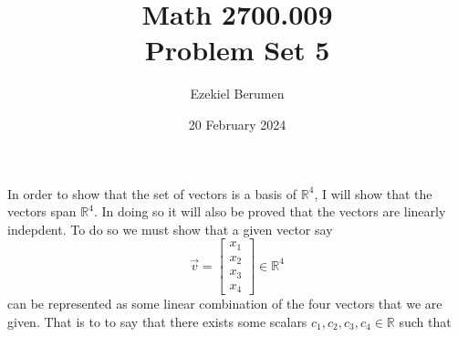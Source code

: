 \documentclass{report}
\title{\Huge{Math 2700.009}\\Problem Set 5}
\author{\huge{Ezekiel Berumen}}
\date{20 February 2024}
\begin{document}
\maketitle
\newpage

\sol In order to show that the set of vectors is a basis of $\mathbb{R}^4$,  I will show that the vectors span $\mathbb{R}^4$. In doing so it will also be proved that the vectors are linearly indepdent.  To do so we must show that a given vector say
$$
\vec{v} =
\begin{bmatrix}
x_1 \\ x_2 \\ x_3 \\ x_4
\end{bmatrix}
\in \mathbb{R}^4
$$
can be represented as some linear combination of the four vectors that we are given.  That is to to say that there exists some scalars $c_1, c_2,c_3,c_4\in\mathbb{R}$ such that
\end{document}
